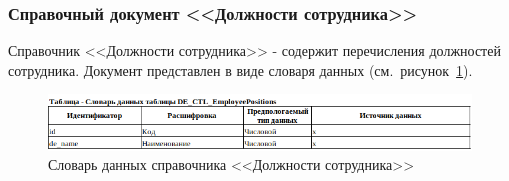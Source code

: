 



\subsubsection{Справочный документ <<Должности сотрудника>>}

Справочник <<Должности сотрудника>> - содержит перечисления должностей сотрудника.
Документ представлен в виде словаря данных (см.~рисунок~\ref{fig:InformationalModel_DE_CTL_EmployeePositions}).

\begin{figure}[!h]
    \centering
    \includegraphics[width=16cm]
    {assets/InformationalModel/DE_CTL_EmployeePositions.png}
    \caption{Словарь данных справочника <<Должности сотрудника>>}
    \label{fig:InformationalModel_DE_CTL_EmployeePositions}
\end{figure}

